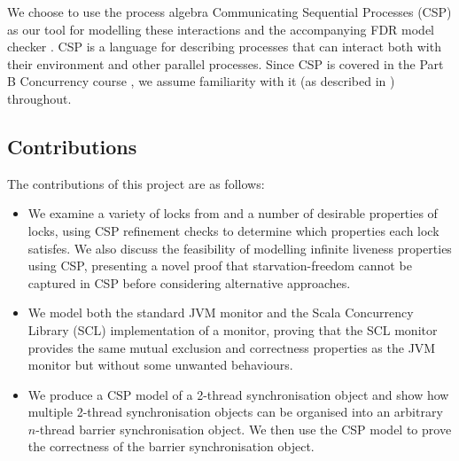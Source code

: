 
We choose to use the process algebra Communicating Sequential Processes (CSP) \cite{RoscoeUCS} as our tool for modelling these interactions and the accompanying FDR model checker \cite{GibsonFDR}. CSP is a language for describing processes that can interact both with their environment and other parallel processes. Since CSP is covered in the Part B Concurrency course \cite{Concurrency}, we assume familiarity with it (as described in \cite{RoscoeUCS}) throughout.



\subsection{Contributions}

The contributions of this project are as follows:

\begin{itemize}
  \item We examine a variety of locks from \cite{CADS} and a number of desirable properties of locks, using CSP refinement checks to determine which properties each lock satisfes. We also discuss the feasibility of modelling infinite liveness properties using CSP, presenting a novel proof that starvation-freedom cannot be captured in CSP before considering alternative approaches.%
  \item We model both the standard JVM monitor and the Scala Concurrency Library (SCL) \cite{CP} implementation of a monitor, proving that the SCL monitor provides the same mutual exclusion and correctness properties as the JVM monitor but without some unwanted behaviours.
  \item We produce a CSP model of a 2-thread synchronisation object and show how multiple 2-thread synchronisation objects can be organised into an arbitrary $n$-thread barrier synchronisation object. We then use the CSP model to prove the correctness of the barrier synchronisation object.
\end{itemize}



